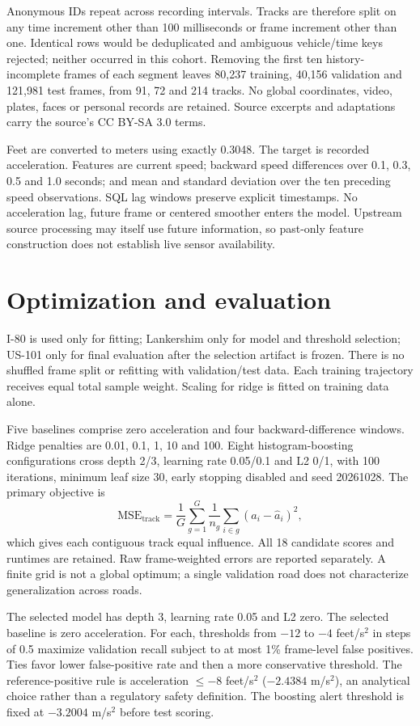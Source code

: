 \documentclass[11pt]{article}
\begin{document}
Anonymous IDs repeat across recording intervals. Tracks are therefore split on any time increment other than 100 milliseconds or frame increment other than one. Identical rows would be deduplicated and ambiguous vehicle/time keys rejected; neither occurred in this cohort. Removing the first ten history-incomplete frames of each segment leaves 80,237 training, 40,156 validation and 121,981 test frames, from 91, 72 and 214 tracks. No global coordinates, video, plates, faces or personal records are retained. Source excerpts and adaptations carry the source's CC BY-SA 3.0 terms.

Feet are converted to meters using exactly 0.3048. The target is recorded acceleration. Features are current speed; backward speed differences over 0.1, 0.3, 0.5 and 1.0 seconds; and mean and standard deviation over the ten preceding speed observations. SQL lag windows preserve explicit timestamps. No acceleration lag, future frame or centered smoother enters the model. Upstream source processing may itself use future information, so past-only feature construction does not establish live sensor availability.

\section{Optimization and evaluation}
I-80 is used only for fitting; Lankershim only for model and threshold selection; US-101 only for final evaluation after the selection artifact is frozen. There is no shuffled frame split or refitting with validation/test data. Each training trajectory receives equal total sample weight. Scaling for ridge is fitted on training data alone.

Five baselines comprise zero acceleration and four backward-difference windows. Ridge penalties are 0.01, 0.1, 1, 10 and 100. Eight histogram-boosting configurations cross depth 2/3, learning rate 0.05/0.1 and L2 0/1, with 100 iterations, minimum leaf size 30, early stopping disabled and seed 20261028. The primary objective is
\[
\mathrm{MSE}_{\mathrm{track}}=\frac1G\sum_{g=1}^{G}\frac1{n_g}\sum_{i\in g}(a_i-\hat a_i)^2,
\]
which gives each contiguous track equal influence. All 18 candidate scores and runtimes are retained. Raw frame-weighted errors are reported separately. A finite grid is not a global optimum; a single validation road does not characterize generalization across roads.

The selected model has depth 3, learning rate 0.05 and L2 zero. The selected baseline is zero acceleration. For each, thresholds from $-12$ to $-4$ feet/s$^2$ in steps of 0.5 maximize validation recall subject to at most 1\% frame-level false positives. Ties favor lower false-positive rate and then a more conservative threshold. The reference-positive rule is acceleration $\leq-8$ feet/s$^2$ ($-2.4384$ m/s$^2$), an analytical choice rather than a regulatory safety definition. The boosting alert threshold is fixed at $-3.2004$ m/s$^2$ before test scoring.
\end{document}
